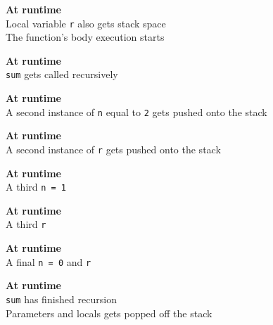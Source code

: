 \begin{frame}
\begin{overprint}
      \begin{center}
        \textbf{At runtime} \\
        Local variable \texttt{r} also gets stack space \\
        The function's body execution starts
      \end{center}

      \begin{center}
        \textbf{At runtime} \\
        \texttt{sum} gets called recursively
      \end{center}

      \begin{center}
        \textbf{At runtime} \\
        A second instance of \texttt{n} equal to \texttt{2} gets pushed onto the stack
      \end{center}

      \begin{center}
        \textbf{At runtime} \\
        A second instance of \texttt{r} gets pushed onto the stack
      \end{center}

      \begin{center}
        \textbf{At runtime} \\
        A third \texttt{n = 1}
      \end{center}

      \begin{center}
        \textbf{At runtime} \\
        A third \texttt{r}
      \end{center}

      \begin{center}
        \textbf{At runtime} \\
        A final \texttt{n = 0} and \texttt{r}
      \end{center}

      \begin{center}
        \textbf{At runtime} \\
        \texttt{sum} has finished recursion \\
        Parameters and locals gets popped off the stack
      \end{center}
  \end{overprint}
\end{frame}



